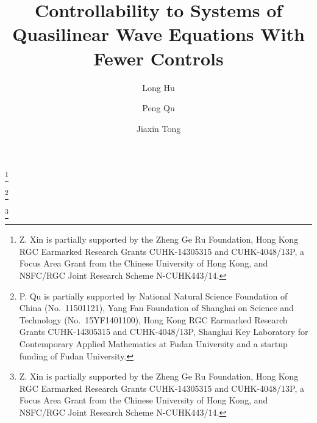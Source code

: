 \documentclass[a4paper,reqno,11pt]{amsart}
\numberwithin{equation}{section} %
\begin{document}
\title{Controllability to Systems of Quasilinear Wave Equations 
With Fewer Controls}


\author{Long Hu}
\address{The Institute of Mathematical Sciences\\
The Chinese University of Hong Kong\\
Shatin, NT, Hong Kong}
\thanks{Z. Xin is partially supported by the Zheng Ge Ru Foundation, Hong Kong RGC Earmarked Research Grants CUHK-14305315 and CUHK-4048/13P, a Focus Area Grant from the Chinese University of Hong Kong, and NSFC/RGC Joint Research Scheme N-CUHK443/14.}



\author{Peng Qu}
\address{
School of Mathematical Sciences\\ Fudan University\\
Shanghai 200433, China
\newline \indent and
\newline \indent The Institute of Mathematical Sciences\\
The Chinese University of Hong Kong\\
Shatin, NT, Hong Kong}
\thanks{P. Qu is partially supported by  National Natural Science Foundation of China (No.~11501121), Yang Fan Foundation of Shanghai on Science and Technology (No.~15YF1401100), Hong Kong RGC Earmarked Research Grants CUHK-14305315 and CUHK-4048/13P, Shanghai Key Laboratory for Contemporary Applied Mathematics at Fudan University and a startup funding of Fudan University.}

\author{Jiaxin Tong}
\address{The Institute of Mathematical Sciences\\
The Chinese University of Hong Kong\\
Shatin, NT, Hong Kong}
\thanks{Z. Xin is partially supported by the Zheng Ge Ru Foundation, Hong Kong RGC Earmarked Research Grants CUHK-14305315 and CUHK-4048/13P, a Focus Area Grant from the Chinese University of Hong Kong, and NSFC/RGC Joint Research Scheme N-CUHK443/14.}


\end{document}
